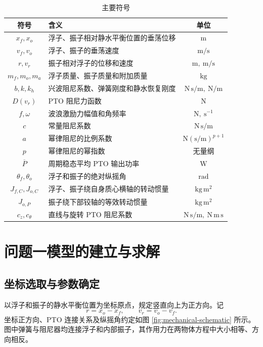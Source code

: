 \documentclass[withoutpreface]{../../../templates/CUMCM2026-Complete-LaTeX/cumcmthesis}
\begin{document}
\begin{table}[H]
  \centering
  \caption{主要符号}
  \label{tab:symbols}
  \begin{tabularx}{0.92\textwidth}{cXc}
    \toprule
    符号 & 含义 & 单位 \\
    \midrule
    $x_f,x_o$ & 浮子、振子相对静水平衡位置的垂荡位移 & $\mathrm{m}$ \\
    $v_f,v_o$ & 浮子、振子的垂荡速度 & $\mathrm{m/s}$ \\
    $r,v_r$ & 振子相对浮子的位移和速度 & $\mathrm{m},\ \mathrm{m/s}$ \\
    $m_f,m_o,m_a$ & 浮子质量、振子质量和附加质量 & $\mathrm{kg}$ \\
    $b,k,k_h$ & 兴波阻尼系数、弹簧刚度和静水恢复刚度 & $\mathrm{N\,s/m},\ \mathrm{N/m}$ \\
    $D(v_r)$ & PTO 阻尼力函数 & $\mathrm{N}$ \\
    $f,\omega$ & 波浪激励力幅值和角频率 & $\mathrm{N},\ \mathrm{s^{-1}}$ \\
    $c$ & 常量阻尼系数 & $\mathrm{N\,s/m}$ \\
    $a$ & 幂律阻尼的比例系数 & $\mathrm{N}(\mathrm{s/m})^{p+1}$ \\
    $p$ & 幂律阻尼的幂指数 & 无量纲 \\
    $\overline P$ & 周期稳态平均 PTO 输出功率 & $\mathrm{W}$ \\
    $\theta_f,\theta_o$ & 浮子和振子的绝对纵摇角 & $\mathrm{rad}$ \\
    $J_{f,C},J_{o,C}$ & 浮子、振子绕自身质心横轴的转动惯量 & $\mathrm{kg\,m^2}$ \\
    $J_{o,P}$ & 振子绕下部铰轴的等效转动惯量 & $\mathrm{kg\,m^2}$ \\
    $c_z,c_\theta$ & 直线与旋转 PTO 阻尼系数 & $\mathrm{N\,s/m},\ \mathrm{N\,m\,s}$ \\
    \bottomrule
  \end{tabularx}
\end{table}

\section{问题一模型的建立与求解}

\subsection{坐标选取与参数确定}

以浮子和振子的静水平衡位置为坐标原点，规定竖直向上为正方向。记
\begin{equation}
 r=x_o-x_f,\qquad v_r=v_o-v_f .
  \label{eq:relative}
\end{equation}
坐标正方向、PTO 连接关系及纵摇角约定如图 \ref{fig:mechanical-schematic} 所示。图中弹簧与阻尼器均连接浮子和内部振子，其作用力在两物体方程中大小相等、方向相反。
\end{document}
